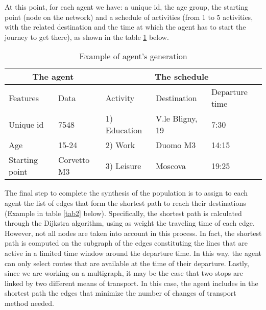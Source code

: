 At this point, for each agent we have: a unique id, the age group, the starting point (node on the network) and a schedule of activities (from 1 to 5 activities, with the related destination and the time at which the agent has to start the journey to get there), as shown in the table \ref{tab1} below. 

\begin{table}[h]
\centering
\caption{Example of agent's generation}\label{tab1}%
\begin{tabular}{ll|lll}
\multicolumn{2}{c|}{The agent} & \multicolumn{3}{c}{The schedule} \\ 
\toprule
Features      & Data      & Activity & Destination & Departure time \\ 
\midrule
Unique id & 7548 & 1) Education & V.le Bligny, 19 & 7:30\\
Age & 15-24  &  2) Work	& Duomo M3 & 14:15\\
Starting point & Corvetto M3 & 3) Leisure & Moscova & 19:25\\
\bottomrule
\end{tabular}
\end{table}

The final step to complete the synthesis of the population is to assign to each agent the list of edges that form the shortest path to reach their destinations (Example in table \ref{tab2} below). Specifically, the shortest path is calculated through the Dijkstra algorithm, using as weight the traveling time of each edge. However, not all nodes are taken into account in this process. In fact, the shortest path is computed on the subgraph of the edges constituting the lines that are active in a limited time window around the departure time. In this way, the agent can only select routes that are available at the time of their departure. Lastly, since we are working on a multigraph, it may be the case that two stops are linked by two different means of transport. In this case, the agent includes in the shortest path the edges that minimize the number of changes of transport method needed.